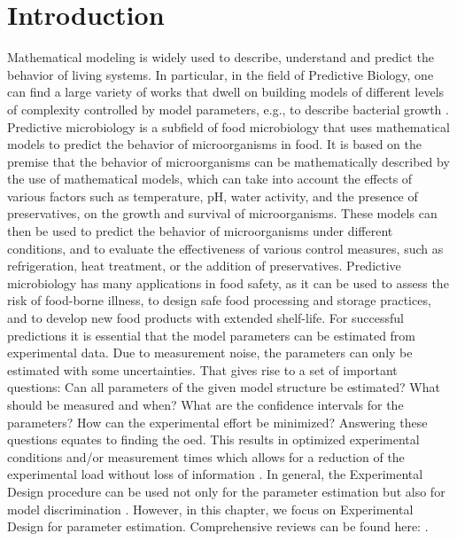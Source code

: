 \documentclass[graybox]{svmult}
\begin{document}
\section*{Introduction}
Mathematical modeling is widely used to describe, understand and predict the behavior of living systems.
In particular, in the field of Predictive Biology, one can find a large variety of works that dwell on building models of different levels of complexity controlled by model parameters, e.g., to describe bacterial growth \cite{bernaertsConceptsToolsPredictive2004}.
Predictive microbiology is a subfield of food microbiology that uses mathematical models to predict the behavior of microorganisms in food.
It is based on the premise that the behavior of microorganisms can be mathematically described by the use of mathematical models, which can take into account the effects of various factors such as temperature, pH, water activity, and the presence of preservatives, on the growth and survival of microorganisms.
These models can then be used to predict the behavior of microorganisms under different conditions, and to evaluate the effectiveness of various control measures, such as refrigeration, heat treatment, or the addition of preservatives.
Predictive microbiology has many applications in food safety, as it can be used to assess the risk of food-borne illness, to design safe food processing and storage practices, and to develop new food products with extended shelf-life.
For successful predictions it is essential that the model parameters can be estimated from experimental data.
Due to measurement noise, the parameters can only be estimated with some uncertainties.
That gives rise to a set of important questions: Can all parameters of the given model structure be estimated?
What should be measured and when? What are the confidence intervals for the parameters? How can the experimental effort be minimized?
Answering these questions equates to finding the \ac{oed}.
This results in optimized experimental conditions and/or measurement times which allows for a reduction of the experimental load without loss of information \cite{derlindenImpactExperimentDesign2013, balsa-cantoe.bangaj.r.COMPUTINGOPTIMALDYNAMIC2008}.
In general, the Experimental Design procedure can be used not only for the parameter estimation but also for model discrimination \cite{kreutzSystemsBiology2009, stamatiOptimalExperimentalDesign2016}.
However, in this chapter, we focus on Experimental Design for parameter estimation.
Comprehensive reviews can be found here: \cite{atkinsonDevelopmentsDesignExperiments1982, franceschiniModelbasedDesignExperiments2008,sunParameterEstimation2011,vilasPredictiveFood2016}.\\\linebreak
\end{document}
